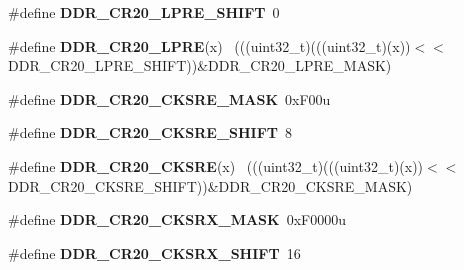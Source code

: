 \begin{DoxyCompactItemize}
\item 
\hypertarget{group___d_d_r___register___masks_ga29f7c03077e1461074db573f7381e04e}{}\#define {\bfseries D\+D\+R\+\_\+\+C\+R20\+\_\+\+L\+P\+R\+E\+\_\+\+S\+H\+I\+F\+T}~0\label{group___d_d_r___register___masks_ga29f7c03077e1461074db573f7381e04e}

\item 
\hypertarget{group___d_d_r___register___masks_ga9b11cc5b189419933962c04ddf1d7d8f}{}\#define {\bfseries D\+D\+R\+\_\+\+C\+R20\+\_\+\+L\+P\+R\+E}(x)                                              ~(((uint32\+\_\+t)(((uint32\+\_\+t)(x))$<$$<$D\+D\+R\+\_\+\+C\+R20\+\_\+\+L\+P\+R\+E\+\_\+\+S\+H\+I\+F\+T))\&D\+D\+R\+\_\+\+C\+R20\+\_\+\+L\+P\+R\+E\+\_\+\+M\+A\+S\+K)\label{group___d_d_r___register___masks_ga9b11cc5b189419933962c04ddf1d7d8f}

\item 
\hypertarget{group___d_d_r___register___masks_ga47c1ce2264778cffd806b58285e09380}{}\#define {\bfseries D\+D\+R\+\_\+\+C\+R20\+\_\+\+C\+K\+S\+R\+E\+\_\+\+M\+A\+S\+K}~0x\+F00u\label{group___d_d_r___register___masks_ga47c1ce2264778cffd806b58285e09380}

\item 
\hypertarget{group___d_d_r___register___masks_ga9dc27e17c13bb6d855a7621753ca1b04}{}\#define {\bfseries D\+D\+R\+\_\+\+C\+R20\+\_\+\+C\+K\+S\+R\+E\+\_\+\+S\+H\+I\+F\+T}~8\label{group___d_d_r___register___masks_ga9dc27e17c13bb6d855a7621753ca1b04}

\item 
\hypertarget{group___d_d_r___register___masks_ga743fc04cd04d39af69bf74a4d44db58d}{}\#define {\bfseries D\+D\+R\+\_\+\+C\+R20\+\_\+\+C\+K\+S\+R\+E}(x)                                            ~(((uint32\+\_\+t)(((uint32\+\_\+t)(x))$<$$<$D\+D\+R\+\_\+\+C\+R20\+\_\+\+C\+K\+S\+R\+E\+\_\+\+S\+H\+I\+F\+T))\&D\+D\+R\+\_\+\+C\+R20\+\_\+\+C\+K\+S\+R\+E\+\_\+\+M\+A\+S\+K)\label{group___d_d_r___register___masks_ga743fc04cd04d39af69bf74a4d44db58d}

\item 
\hypertarget{group___d_d_r___register___masks_ga1f586b59b7376a638087c197eaf276f0}{}\#define {\bfseries D\+D\+R\+\_\+\+C\+R20\+\_\+\+C\+K\+S\+R\+X\+\_\+\+M\+A\+S\+K}~0x\+F0000u\label{group___d_d_r___register___masks_ga1f586b59b7376a638087c197eaf276f0}

\item 
\hypertarget{group___d_d_r___register___masks_ga4b600587a2df603f6b64ed3eb7d86e67}{}\#define {\bfseries D\+D\+R\+\_\+\+C\+R20\+\_\+\+C\+K\+S\+R\+X\+\_\+\+S\+H\+I\+F\+T}~16\label{group___d_d_r___register___masks_ga4b600587a2df603f6b64ed3eb7d86e67}


\end{DoxyCompactItemize}
